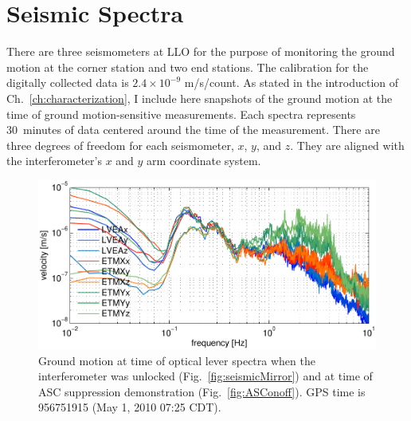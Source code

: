 


\section{Seismic Spectra}
\label{sec:groundmotion}
There are three seismometers at LLO for the purpose of monitoring the
ground motion at the corner station and two end stations. The
calibration for the digitally collected data is $2.4 \times 10^{-9}$
m/s/count. As stated in the introduction of
Ch.~\ref{ch:characterization}, I include here snapshots of the ground
motion at the time of ground motion-sensitive measurements. Each
spectra represents 30~minutes of data centered around the time of the
measurement. There are three degrees of freedom for each seismometer,
$x$, $y$, and $z$. They are aligned with the interferometer's $x$ and
$y$ arm coordinate system.

\begin{figure}
\begin{centering}
\includegraphics[width=1.0\textwidth]{figures/seis956751915_nolock.pdf}
\caption[]{Ground motion at time of optical lever spectra when the
  interferometer was unlocked (Fig.~\ref{fig:seismicMirror}) and at
  time of ASC suppression demonstration (Fig.~\ref{fig:ASConoff}). GPS
  time is 956751915 (May 1, 2010 07:25 CDT).}
\label{fig:seismic_nolock}
\end{centering}
\end{figure}


